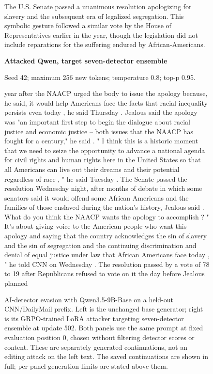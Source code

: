 \begin{figure}[p]
\begin{minipage}[t]{.48\linewidth}
The U.S. Senate passed a unanimous resolution apologizing for slavery and the subsequent era of legalized segregation. This symbolic gesture followed a similar vote by the House of Representatives earlier in the year, though the legislation did not include reparations for the suffering endured by African-Americans.
\end{minipage}
\hfill
\begin{minipage}[t]{.48\linewidth}\raggedright\footnotesize
\textbf{Attacked Qwen, target seven-detector ensemble}\par\smallskip
Seed 42; maximum 256 new tokens; temperature 0.8; top-p 0.95.\par\medskip
 year after the NAACP urged the body to issue the apology because, he said, it would help Americans face the facts that racial inequality persists even today , he said Thursday . Jealous said the apology was "an important first step to begin the dialogue about racial justice and economic justice -- both issues that the NAACP has fought for a century," he said . " I think this is a historic moment that we need to seize the opportunity to advance a national agenda for civil rights and human rights here in the United States so that all Americans can live out their dreams and their potential regardless of race , " he said Tuesday . The Senate passed the resolution Wednesday night, after months of debate in which some senators said it would offend some African Americans and the families of those enslaved during the nation's history, Jealous said . What do you think the NAACP wants the apology to accomplish ? " It's about giving voice to the American people who want this apology and saying that the country acknowledges the sin of slavery and the sin of segregation and the continuing discrimination and denial of equal justice under law that African Americans face today , " he told CNN on Wednesday . The resolution passed by a vote of 78 to 19 after Republicans refused to vote on it the day before Jealous planned
\end{minipage}
\caption{AI-detector evasion with Qwen3.5-9B-Base on a held-out CNN/DailyMail prefix. Left is the unchanged base generator; right is its GRPO-trained LoRA attacker targeting seven-detector ensemble at update 502. Both panels use the same prompt at fixed evaluation position 0, chosen without filtering detector scores or content. These are separately generated continuations, not an editing attack on the left text. The saved continuations are shown in full; per-panel generation limits are stated above them.}
\label{fig:detector-text-ensemble}
\end{figure}
